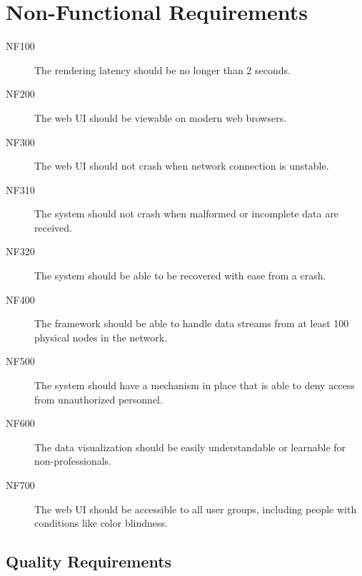 \documentclass[twoside, english, draft]{Pflichtenheft}
\begin{document}
\section{Non-Functional Requirements}

\begin{description}

	\item[NF100]
	      The rendering latency should be no longer than 2 seconds.

	\item[NF200]
	      The web UI should be viewable on modern web browsers.

	\item[NF300]
	      The web UI should not crash when network connection is unstable.

	\item[NF310]
	      The system should not crash when malformed or incomplete data are received.
	\item[NF320]
	      The system should be able to be recovered with ease from a crash.

	\item[NF400]
	      The framework should be able to handle \glspl{data stream} from at least 100 physical nodes in the network.

	\item[NF500]
	      The system should have a mechanism in place that is able to deny access from unauthorized personnel.

	\item[NF600]
	      The data visualization should be easily understandable or learnable for non-professionals.

	\item[NF700]
	      The web UI should be accessible to all user groups, including people with conditions like color blindness.


\end{description}
\subsection{Quality Requirements}
\end{document}
